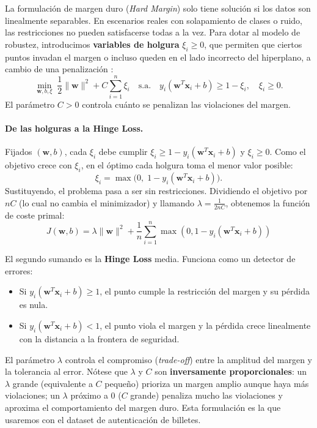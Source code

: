 \documentclass[12pt, a4paper]{article}
\begin{document}
\noindent La formulación de margen duro (\textit{Hard Margin}) solo tiene solución si los datos son linealmente separables. En escenarios reales con solapamiento de clases o ruido, las restricciones no pueden satisfacerse todas a la vez. Para dotar al modelo de robustez, introducimos \textbf{variables de holgura} $\xi_i \geq 0$, que permiten que ciertos puntos invadan el margen o incluso queden en el lado incorrecto del hiperplano, a cambio de una penalización \cite{cortes1995support}:
\[ \min_{\mathbf{w}, b, \xi} \; \frac{1}{2}\|\mathbf{w}\|^2 + C \sum_{i=1}^n \xi_i \quad \text{s.a.} \quad y_i(\mathbf{w}^T \mathbf{x}_i + b) \geq 1 - \xi_i, \quad \xi_i \geq 0. \]
El parámetro $C > 0$ controla cuánto se penalizan las violaciones del margen.

\paragraph{De las holguras a la Hinge Loss.} Fijados $(\mathbf{w}, b)$, cada $\xi_i$ debe cumplir $\xi_i \geq 1 - y_i(\mathbf{w}^T \mathbf{x}_i + b)$ y $\xi_i \geq 0$. Como el objetivo crece con $\xi_i$, en el óptimo cada holgura toma el menor valor posible:
\[ \xi_i = \max\big(0,\; 1 - y_i(\mathbf{w}^T \mathbf{x}_i + b)\big). \]
Sustituyendo, el problema pasa a ser sin restricciones. Dividiendo el objetivo por $nC$ (lo cual no cambia el minimizador) y llamando $\lambda = \frac{1}{2nC}$, obtenemos la función de coste primal:
\[ J(\mathbf{w}, b) = \lambda \|\mathbf{w}\|^2 + \frac{1}{n} \sum_{i=1}^n \max(0, 1 - y_i(\mathbf{w}^T \mathbf{x}_i + b)) \]

\noindent El segundo sumando es la \textbf{Hinge Loss} media. Funciona como un detector de errores:
\begin{itemize}
    \item Si $y_i(\mathbf{w}^T \mathbf{x}_i + b) \geq 1$, el punto cumple la restricción del margen y su pérdida es nula.
    \item Si $y_i(\mathbf{w}^T \mathbf{x}_i + b) < 1$, el punto viola el margen y la pérdida crece linealmente con la distancia a la frontera de seguridad.
\end{itemize}

\noindent El parámetro $\lambda$ controla el compromiso (\textit{trade-off}) entre la amplitud del margen y la tolerancia al error. Nótese que $\lambda$ y $C$ son \textbf{inversamente proporcionales}: un $\lambda$ grande (equivalente a $C$ pequeño) prioriza un margen amplio aunque haya más violaciones; un $\lambda$ próximo a $0$ ($C$ grande) penaliza mucho las violaciones y aproxima el comportamiento del margen duro. Esta formulación es la que usaremos con el dataset de autenticación de billetes.
\end{document}
